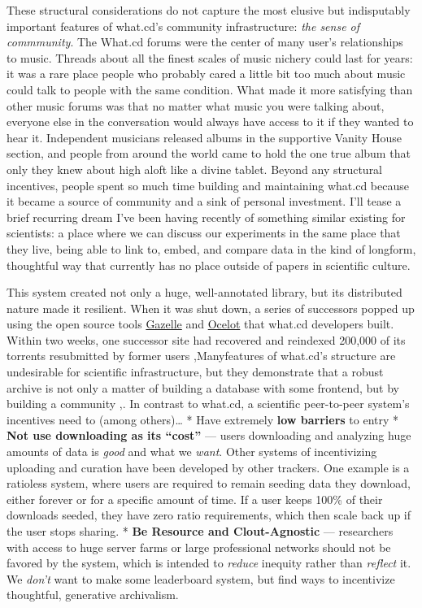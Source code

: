 \documentclass[nohyper]{tufte-book-jls}
\begin{document}
These structural considerations do not capture the most elusive but
indisputably important features of what.cd's community infrastructure:
\emph{the sense of commmunity}. The What.cd forums were the center of
many user's relationships to music. Threads about all the finest scales
of music nichery could last for years: it was a rare place people who
probably cared a little bit too much about music could talk to people
with the same condition. What made it more satisfying than other music
forums was that no matter what music you were talking about, everyone
else in the conversation would always have access to it if they wanted
to hear it. Independent musicians released albums in the
supportive
Vanity House section, and people from around the world came to hold the
one true album that only they knew about high aloft like a divine
tablet. Beyond any structural incentives, people spent so much time
building and maintaining what.cd because it became a source of community
and a sink of personal investment. I'll tease a brief recurring dream
I've been having recently of something similar existing for scientists:
a place where we can discuss our experiments in the same place that they
live, being able to link to, embed, and compare data in the kind of
longform, thoughtful way that currently has no place outside of papers
in scientific culture.

This system created not only a huge, well-annotated library, but its
distributed nature made it resilient. When it was shut down, a series of
successors popped up using the open source tools
\href{https://github.com/WhatCD/Gazelle}{Gazelle} and
\href{https://github.com/WhatCD/Ocelot}{Ocelot} that what.cd developers
built. Within two weeks, one successor site had recovered and reindexed
200,000 of its torrents resubmitted by former users \cite{vandersarWhatCdDead2016},Manyfeatures of what.cd's structure are undesirable for scientific
infrastructure, but they demonstrate that a robust archive is not only a
matter of building a database with some frontend, but by building a
community \cite{brossCommunityCollaborationContribution2013},.
In contrast to what.cd, a scientific peer-to-peer system's incentives
need to (among others)\ldots{} * Have extremely \textbf{low barriers} to
entry * \textbf{Not use downloading as its ``cost''} --- users
downloading and analyzing huge amounts of data is \emph{good} and what
we \emph{want}. Other systems of incentivizing uploading and curation
have been developed by other trackers. One example is a ratioless
system, where users are required to remain seeding data they download,
either forever or for a specific amount of time. If a user keeps 100\%
of their downloads seeded, they have zero ratio requirements, which then
scale back up if the user stops sharing. * \textbf{Be Resource and
Clout-Agnostic} --- researchers with access to huge server farms or
large professional networks should not be favored by the system, which
is intended to \emph{reduce} inequity rather than \emph{reflect} it. We
\emph{don't} want to make some leaderboard system, but find ways to
incentivize thoughtful, generative archivalism.
\end{document}
